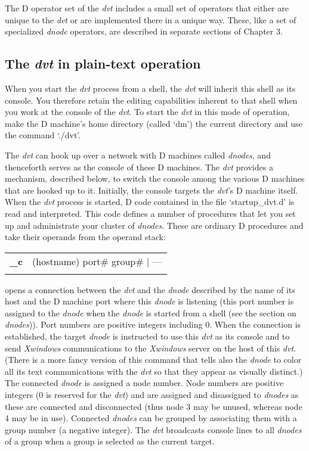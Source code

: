 The D operator set of the \emph{dvt} includes a small set of operators that either are unique to the \emph{dvt} or are implemented there in a unique way. These, like a set of specialized \emph{dnode} operators, are described in separate sections of Chapter 3.

\subsection{The \emph{dvt} in plain-text operation}

When you start the \emph{dvt} process from a shell, the \emph{dvt} will inherit this shell as its console. You therefore retain the editing capabilities inherent to that shell when you work at the console of the \emph{dvt}. To start the \emph{dvt} in this mode of operation, make the D machine's home directory (called `dm') the current directory and use the command `./dvt'.

The \emph{dvt} can hook up over a network with D machines called \emph{dnodes}, and thenceforth serves as the console of these D machines. The \emph{dvt} provides a mechanism, described below, to switch the console among the various D machines that are hooked up to it. Initially, the console targets the \emph{dvt}'s D machine itself. When the \emph{dvt} process is started, D code contained in the file `startup\_dvt.d' is read and interpreted. This code defines a number of procedures that let you set up and administrate your cluster of \emph{dnodes}. These are ordinary D procedures and take their operands from the operand stack:\\ 

\begin{tabular}{>{\sffamily\bfseries}l>{\sffamily}l}
\_c    & (hostname) port\# group\# $|$ ---\\\\
\end{tabular}

\noindent opens a connection between the \emph{dvt} and the \emph{dnode} described by the name of its host and the D machine port where this \emph{dnode} is listening (this port number is assigned to the \emph{dnode} when the \emph{dnode} is started from a shell (see the section on \emph{dnodes})). Port numbers are positive integers including $0$. When the connection is established, the target \emph{dnode} is instructed to use this \emph{dvt} as its console and to send \emph{Xwindows} communications to the \emph{Xwindows} server on the host of this \emph{dvt}. (There is a more fancy version of this command that tells also the \emph{dnode} to color all its text communications with the \emph{dvt} so that they appear as visually distinct.) The connected \emph{dnode} is assigned a node number. Node numbers are positive integers ($0$ is reserved for the \emph{dvt}) and are assigned and disassigned to \emph{dnodes} as these are connected and disconnected (thus node 3 may be unused, whereas node 4 may be in use). Connected \emph{dnodes} can be grouped by associating them with a group number (a negative integer). The \emph{dvt} broadcasts console lines to all \emph{dnodes} of a group when a group is selected as the current target.\\

